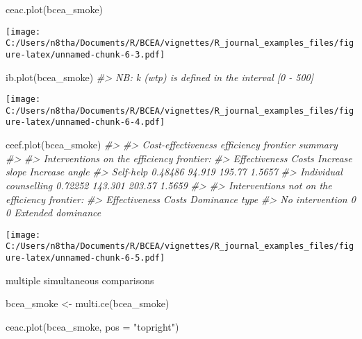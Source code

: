 \documentclass[
]{article}
\newenvironment{Shaded}{\begin{snugshade}}{\end{snugshade}}
\newcommand{\AttributeTok}[1]{\textcolor[rgb]{0.77,0.63,0.00}{#1}}
\newcommand{\CommentTok}[1]{\textcolor[rgb]{0.56,0.35,0.01}{\textit{#1}}}
\newcommand{\FunctionTok}[1]{\textcolor[rgb]{0.00,0.00,0.00}{#1}}
\newcommand{\NormalTok}[1]{#1}
\newcommand{\OtherTok}[1]{\textcolor[rgb]{0.56,0.35,0.01}{#1}}
\newcommand{\StringTok}[1]{\textcolor[rgb]{0.31,0.60,0.02}{#1}}
\begin{document}
\begin{Shaded}
\begin{Highlighting}[]

\FunctionTok{ceac.plot}\NormalTok{(bcea\_smoke)}
\end{Highlighting}
\end{Shaded}

\texttt{[image: C:/Users/n8tha/Documents/R/BCEA/vignettes/R\_journal\_examples\_files/figure-latex/unnamed-chunk-6-3.pdf]}

\begin{Shaded}
\begin{Highlighting}[]

\FunctionTok{ib.plot}\NormalTok{(bcea\_smoke)}
\CommentTok{\#\textgreater{} NB: k (wtp) is defined in the interval [0 {-} 500]}
\end{Highlighting}
\end{Shaded}

\texttt{[image: C:/Users/n8tha/Documents/R/BCEA/vignettes/R\_journal\_examples\_files/figure-latex/unnamed-chunk-6-4.pdf]}

\begin{Shaded}
\begin{Highlighting}[]

\FunctionTok{ceef.plot}\NormalTok{(bcea\_smoke)}
\CommentTok{\#\textgreater{} }
\CommentTok{\#\textgreater{} Cost{-}effectiveness efficiency frontier summary }
\CommentTok{\#\textgreater{} }
\CommentTok{\#\textgreater{} Interventions on the efficiency frontier:}
\CommentTok{\#\textgreater{}                        Effectiveness   Costs Increase slope Increase angle}
\CommentTok{\#\textgreater{} Self{-}help                    0.48486  94.919         195.77         1.5657}
\CommentTok{\#\textgreater{} Individual counselling       0.72252 143.301         203.57         1.5659}
\CommentTok{\#\textgreater{} }
\CommentTok{\#\textgreater{} Interventions not on the efficiency frontier:}
\CommentTok{\#\textgreater{}                 Effectiveness Costs     Dominance type}
\CommentTok{\#\textgreater{} No intervention             0     0 Extended dominance}
\end{Highlighting}
\end{Shaded}

\texttt{[image: C:/Users/n8tha/Documents/R/BCEA/vignettes/R\_journal\_examples\_files/figure-latex/unnamed-chunk-6-5.pdf]}

multiple simultaneous comparisons

\begin{Shaded}
\begin{Highlighting}[]
\NormalTok{bcea\_smoke }\OtherTok{\textless{}{-}} \FunctionTok{multi.ce}\NormalTok{(bcea\_smoke)}

\FunctionTok{ceac.plot}\NormalTok{(bcea\_smoke, }\AttributeTok{pos =} \StringTok{"topright"}\NormalTok{)}
\end{Highlighting}
\end{Shaded}
\end{document}
